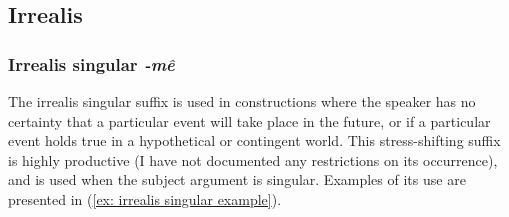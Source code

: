 \subsection{Irrealis}
\label{subsec: irrealis}

\subsubsection{Irrealis singular \textit{-mê}}
\label{subsubsec: irrealis singular}

The irrealis singular suffix is used in constructions where the speaker has no certainty that a particular event will take place in the future, or if a particular event holds true in a hypothetical or contingent world. This stress-shifting suffix is highly productive (I have not documented any restrictions on its occurrence), and is used when the subject argument is singular. Examples of its use are presented in (\ref{ex: irrealis singular example}).

\ea\label{ex: irrealis singular example}

    \z
\z

